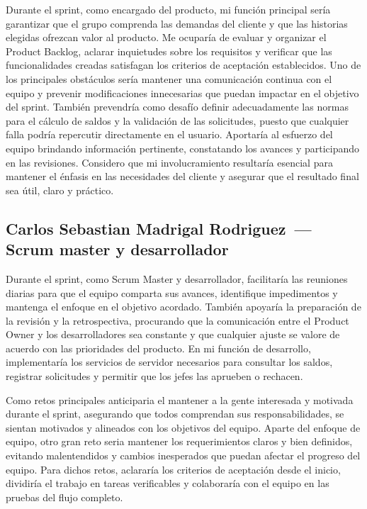 \documentclass[12pt,letterpaper]{article}
\newcommand{\IntB}{Carlos Sebastian Madrigal Rodriguez}
\begin{document}
\begin{redactar}
\small
Durante el sprint, como encargado del producto, mi función principal sería garantizar que el grupo comprenda las demandas del cliente y que las historias elegidas ofrezcan valor al producto. Me ocuparía de evaluar y organizar el Product Backlog, aclarar inquietudes sobre los requisitos y verificar que las funcionalidades creadas satisfagan los criterios de aceptación establecidos. Uno de los principales obstáculos sería mantener una comunicación continua con el equipo y prevenir modificaciones innecesarias que puedan impactar en el objetivo del sprint. También prevendría como desafío definir adecuadamente las normas para el cálculo de saldos y la validación de las solicitudes, puesto que cualquier falla podría repercutir directamente en el usuario. Aportaría al esfuerzo del equipo brindando información pertinente, constatando los avances y participando en las revisiones. Considero que mi involucramiento resultaría esencial para mantener el énfasis en las necesidades del cliente y asegurar que el resultado final sea útil, claro y práctico.
\end{redactar}

\subsection*{\IntB\ — Scrum master y desarrollador}

\begin{redactar}
\small
Durante el sprint, como Scrum Master y desarrollador, facilitaría las reuniones
diarias para que el equipo comparta sus avances, identifique impedimentos y
mantenga el enfoque en el objetivo acordado. También apoyaría la preparación de
la revisión y la retrospectiva, procurando que la comunicación entre el Product
Owner y los desarrolladores sea constante y que cualquier ajuste se valore de
acuerdo con las prioridades del producto. En mi función de desarrollo,
implementaría los servicios de servidor necesarios para consultar los saldos,
registrar solicitudes y permitir que los jefes las aprueben o rechacen.

Como retos principales anticiparia el mantener a la gente interesada y motivada 
durante el sprint, asegurando que todos comprendan sus responsabilidades, se sientan 
motivados y alineados con los objetivos del equipo. Aparte del enfoque de equipo,
otro gran reto seria mantener los requerimientos claros y bien definidos, evitando 
malentendidos y cambios inesperados que puedan afectar el progreso del equipo.
Para dichos retos, aclararía los criterios de aceptación desde el inicio, dividiría 
el trabajo en tareas verificables y colaboraría con el equipo en las pruebas del 
flujo completo.
\end{redactar}
\end{document}

